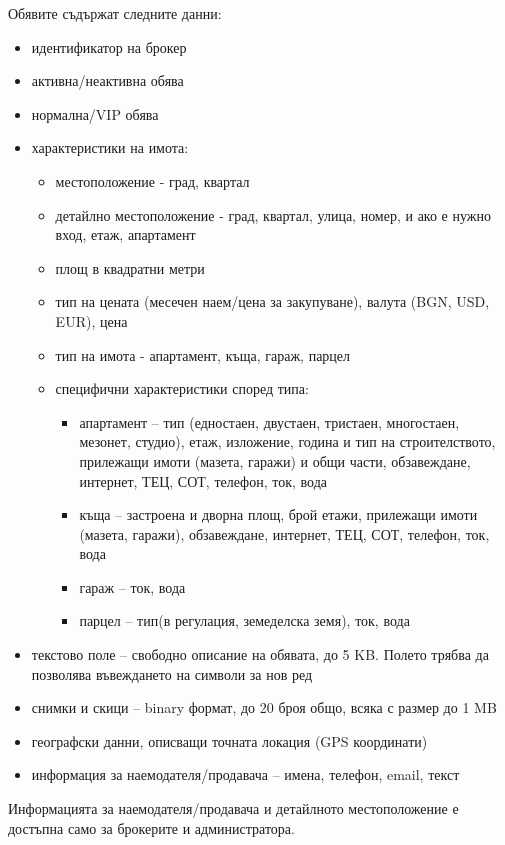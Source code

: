 \documentclass[]{article}
\begin{document}
\begin{enumerate}[I.]
{\begin{enumerate}[1.]
{				Обявите съдържат следните данни:
				\begin{itemize}
					\item идентификатор на брокер
					\item активна/неактивна обява 
					\item нормална/VIP обява
					\item {характеристики на имота:
						\begin{itemize}
							\item местоположение - град, квартал
							\item детайлно местоположение - град, квартал, улица, номер, и ако е нужно вход, етаж, апартамент
							\item площ в квадратни метри
							\item тип на цената (месечен наем/цена за закупуване), валута (BGN, USD, EUR), цена
							\item тип на имота - апартамент, къща, гараж, парцел
							\item {специфични характеристики според типа:
								\begin{itemize}
									\item апартамент -- тип (едностаен, двустаен, тристаен, многостаен, мезонет, студио), етаж, изложение, година и тип на строителството, прилежащи имоти (мазета, гаражи) и общи части, обзавеждане, интернет, ТЕЦ, СОТ, телефон, ток, вода
									\item къща -- застроена и дворна площ, брой етажи, прилежащи имоти (мазета, гаражи),	обзавеждане, интернет, ТЕЦ, СОТ, телефон, ток, вода
									\item гараж -- ток, вода
									\item парцел -- тип(в регулация, земеделска земя), ток, вода
								\end{itemize}
							}
						\end{itemize}
					}
					\item текстово поле -- свободно описание на обявата, до 5 KB. Полето трябва да позволява въвеждането на символи за нов ред
					\item снимки и скици -- binary формат, до 20 броя общо, всяка с размер до 1 MB 
					\item географски данни, описващи точната локация (GPS координати)
					\item информация за наемодателя/продавача -- имена, телефон, email, текст
				\end{itemize}
				
				Информацията за наемодателя/продавача и детайлното местоположение е достъпна само за брокерите и администратора.
			}
			

\end{enumerate}}
\end{enumerate}
\end{document}
